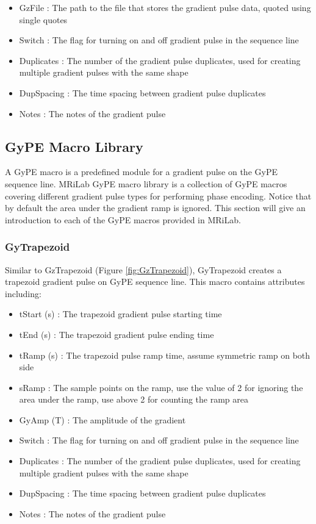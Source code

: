 \documentclass{book}%
\begin{document}
\begin{itemize}
	\item GzFile : The path to the file that stores the gradient pulse data, quoted using single quotes
	\item Switch : The flag for turning on and off gradient pulse in the sequence line
	\item Duplicates : The number of the gradient pulse duplicates, used for creating multiple gradient pulses with the same shape
	\item DupSpacing : The time spacing between gradient pulse duplicates
	\item Notes : The notes of the gradient pulse 
\end{itemize}


\subsection{GyPE Macro Library}

A GyPE macro is a predefined module for a gradient pulse on the GyPE sequence line. MRiLab GyPE macro library is a collection of GyPE macros covering different gradient pulse types for performing phase encoding. Notice that by default the area under the gradient ramp is ignored. This section will give an introduction to each of the GyPE macros provided in MRiLab.

\subsubsection{GyTrapezoid}

Similar to GzTrapezoid (Figure \ref{fig:GzTrapezoid}), GyTrapezoid creates a trapezoid gradient pulse on GyPE sequence line. This macro contains attributes including:

\begin{itemize}
	\item tStart (s) : The trapezoid gradient pulse starting time
	\item tEnd (s) : The trapezoid gradient pulse ending time
	\item tRamp (s) : The trapezoid pulse ramp time, assume symmetric ramp on both side
	\item sRamp : The sample points on the ramp, use the value of 2 for ignoring the area under the ramp, use above 2 for counting the ramp area
	\item GyAmp (T) : The amplitude of the gradient
	\item Switch : The flag for turning on and off gradient pulse in the sequence line
	\item Duplicates : The number of the gradient pulse duplicates, used for creating multiple gradient pulses with the same shape
	\item DupSpacing : The time spacing between gradient pulse duplicates
	\item Notes : The notes of the gradient pulse 
\end{itemize}
\end{document}
